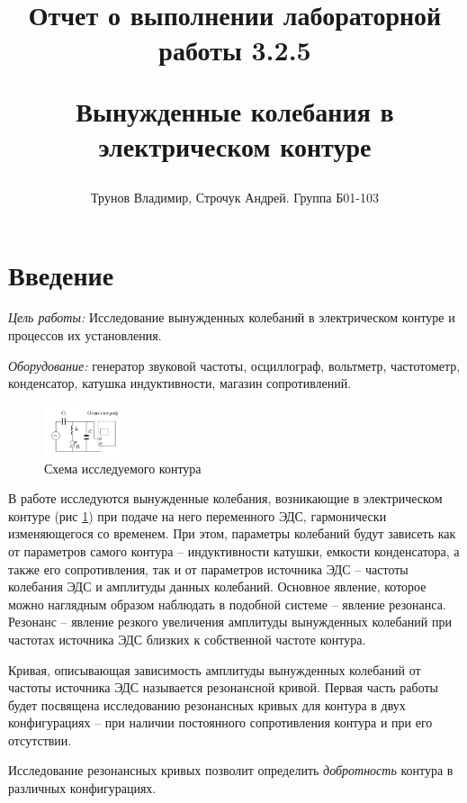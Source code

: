 \documentclass[10pt,a4paper]{article}
\title{
Отчет о выполнении лабораторной работы 3.2.5

Вынужденные колебания в электрическом контуре
}
\author{
\vspace{20 cm}
Трунов Владимир, Строчук Андрей. Группа Б01-103}
\begin{document}
\maketitle

\newpage

	\section{Введение}
	
	\textit{Цель работы:} Исследование вынужденных колебаний в электрическом контуре и процессов их установления.
	
	\textit{Оборудование:} генератор звуковой частоты, осциллограф, вольтметр, частотометр, конденсатор, катушка индуктивности, магазин сопротивлений.
	
	\begin{figure}
		\vspace{-0.5cm}
		\centering
		\includegraphics[width = 0.2\textwidth]{schem_of_circuit}
		\caption{Схема исследуемого контура}
		\label{fig:schem_of_circuit}
	\end{figure}
	
	В работе исследуются вынужденные колебания, возникающие в электрическом контуре (рис \ref{fig:schem_of_circuit}) при подаче на него переменного ЭДС, гармонически изменяющегося со временем. При этом, параметры колебаний будут зависеть как от параметров самого контура -- индуктивности катушки, емкости конденсатора, а также его сопротивления, так и от параметров источника ЭДС -- частоты колебания ЭДС и амплитуды данных колебаний. Основное явление, которое можно наглядным образом наблюдать в подобной системе -- явление резонанса. Резонанс -- явление резкого увеличения амплитуды вынужденных колебаний при частотах источника ЭДС близких к собственной частоте контура.
	
	Кривая, описывающая зависимость амплитуды вынужденных колебаний от частоты источника ЭДС называется резонансной кривой. Первая часть работы будет посвящена исследованию резонансных кривых для контура в двух конфигурациях -- при наличии постоянного сопротивления контура и при его отсутствии.
	
	Исследование резонансных кривых позволит определить \textit{добротность} контура в различных конфигурациях. 
	
\end{document}
